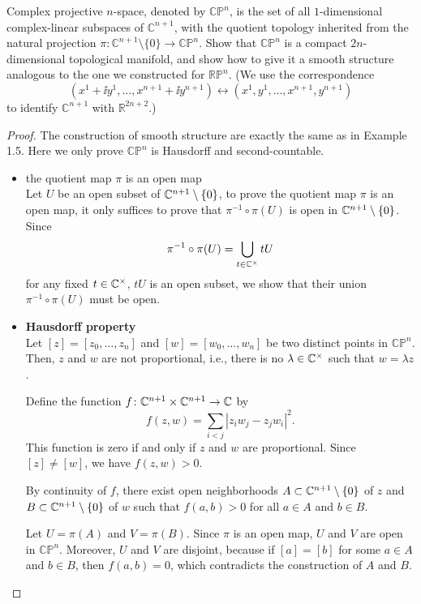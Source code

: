 \begin{problem}
  Complex projective $n$-space, denoted by $\mathbb{CP}^n$, is the set of all $1$-dimensional 
  complex-linear subspaces of $\mathbb{C}^{n+1}$, with the quotient topology inherited 
  from the natural projection $\pi \colon \mathbb{C}^{n+1} \setminus \{0\} \to \mathbb{CP}^n$. 
  Show that $\mathbb{CP}^n$ is a compact $2n$-dimensional topological manifold, and show how to give it a 
  smooth structure analogous to the one we constructed for $\mathbb{RP}^n$. (We use the 
  correspondence
  $$ (x^1 + \ii y^1, \dots, x^{n+1} + \ii y^{n+1}) \leftrightarrow (x^1, y^1, \dots, x^{n+1}, y^{n+1}) $$
  to identify $\mathbb{C}^{n+1}$ with $\mathbb{R}^{2n+2}$.)
  \begin{proof}
    The construction of smooth structure are exactly the same as in Example 1.5. Here we only prove $\mathbb{CP}^n$ is Hausdorff and second-countable.
    \begin{itemize}
      \item the quotient map $\pi$ is an open map\\
      Let $U$ be an open subset of $\mathbb{C}^{n+1} \setminus \{0\}$, to prove the quotient map $\pi$ is an open map, it only suffices to prove that $\pi^{-1} \circ \pi (U)$ is open in $\mathbb{C}^{n+1} \setminus \{0\}$. Since
      \[
      \pi^{-1} \circ \pi (U) = \bigcup_{t \in \mathbb{C}^{\times}}tU
      \]
      for any fixed $t \in \mathbb{C}^{\times}$, $tU$ is an open subset, we show that their union $\pi^{-1} \circ \pi (U)$ must be open.
      \item \textbf{Hausdorff property}\\
      Let $[z] = [z_0 , \dots , z_n]$ and $[w] = [w_0 , \dots , w_n]$ be two distinct points in $\mathbb{CP}^n$. Then, $z$ and $w$ are not proportional, i.e., there is no $\lambda \in \mathbb{C}^{\times}$ such that $w = \lambda z$. 

      Define the function $f \colon \mathbb{C}^{n+1} \times \mathbb{C}^{n+1} \to \mathbb{C}$ by
      $$
      f(z, w) = \sum_{i < j} |z_i w_j - z_j w_i|^2.
      $$
      This function is zero if and only if $z$ and $w$ are proportional. Since $[z] \neq [w]$, we have $f(z, w) > 0$. 

      By continuity of $f$, there exist open neighborhoods $A \subset \mathbb{C}^{n+1} \setminus \{0\}$ of $z$ and $B \subset \mathbb{C}^{n+1} \setminus \{0\}$ of $w$ such that $f(a, b) > 0$ for all $a \in A$ and $b \in B$. 

      Let $U = \pi(A)$ and $V = \pi(B)$. Since $\pi$ is an open map, $U$ and $V$ are open in $\mathbb{CP}^n$. Moreover, $U$ and $V$ are disjoint, because if $[a] = [b]$ for some $a \in A$ and $b \in B$, then $f(a, b) = 0$, which contradicts the construction of $A$ and $B$. 


\end{itemize}
\end{proof}
\end{problem}
